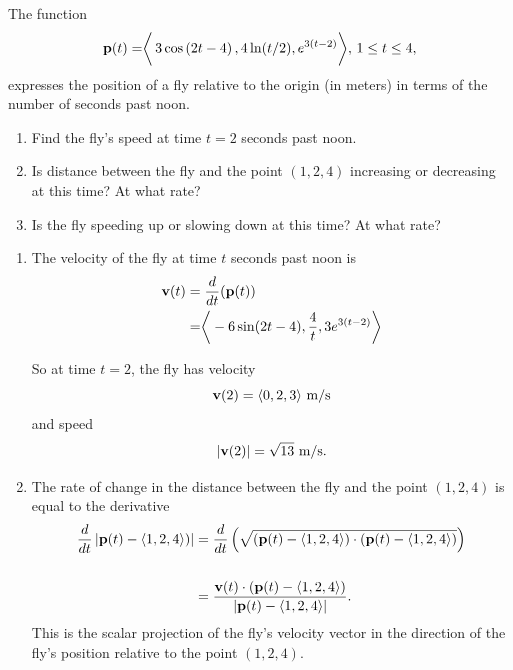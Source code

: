 \documentclass{ximera}
\begin{document}
\begin{question}  \label{Qdf5r4r54tr}

The function
\[
   {\bf p}(t) = \biggr \langle  \, 3\cos\left( 2t-4 \right), 4 \ln (t/2) , e^{3(t-2)} \biggr \rangle , \, 1 \leq t \leq 4 ,
\] 
expresses the position of a fly relative to the origin (in meters) in terms of the number of seconds past noon.

\begin{enumerate}
\item Find the fly's speed at time $t=2$ seconds past noon.

\item Is distance between the fly and the point $(1,2,4)$ increasing or decreasing at this time? At what rate?

\item Is the fly speeding up or slowing down at this time? At what rate?

\end{enumerate}


\begin{explanation}
\begin{enumerate}
\item The velocity of the fly at time $t$ seconds past noon is
\begin{align*}
   {\bf v} (t) & = \frac{d}{dt}({\bf p}(t)) \\
               & = \biggr \langle -6\sin(2t-4) , \frac{4}{t} , 3e^{3(t-2)}  \biggr \rangle 
\end{align*}

So at time $t=2$, the fly has velocity 
\[
    {\bf v}(2) = \langle 0 , 2, 3  \rangle \text{ m/s} 
\]
and speed
\[
 |{\bf v}(2)| = \sqrt{13} \text{ m/s} .
\]

\item The rate of change in the distance between the fly and the point $(1,2,4)$ is equal to the derivative
\begin{align*}
   \frac{d}{dt} \left| {\bf p}(t) - \langle 1,2,4 \rangle) \right| &= \frac{d}{dt} \left( \sqrt{({\bf p}(t) - \langle 1,2,4 \rangle)\cdot({\bf p}(t) - \langle 1,2,4 \rangle)} \right)   \\ \\
               &= \frac{{\bf v}(t)\cdot({\bf p}(t) - \langle 1,2,4 \rangle)}{|{\bf p}(t) - \langle 1,2,4 \rangle|} .
\end{align*}
This is the scalar projection of the fly's velocity vector in the direction of the fly's position relative to the point $(1,2,4)$. 


\end{enumerate}
\end{explanation}
\end{question}
\end{document}
